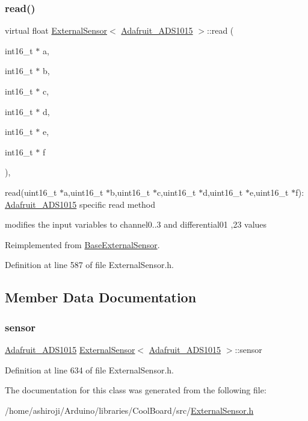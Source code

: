 \subsubsection{\texorpdfstring{read()}{read()}}
{\footnotesize\ttfamily virtual float \hyperlink{class_external_sensor}{External\+Sensor}$<$ \hyperlink{class_adafruit___a_d_s1015}{Adafruit\+\_\+\+A\+D\+S1015} $>$\+::read (\begin{DoxyParamCaption}\item[{int16\+\_\+t $\ast$}]{a,  }\item[{int16\+\_\+t $\ast$}]{b,  }\item[{int16\+\_\+t $\ast$}]{c,  }\item[{int16\+\_\+t $\ast$}]{d,  }\item[{int16\+\_\+t $\ast$}]{e,  }\item[{int16\+\_\+t $\ast$}]{f }\end{DoxyParamCaption})\hspace{0.3cm}{\ttfamily [inline]}, {\ttfamily [virtual]}}

read(uint16\+\_\+t $\ast$a,uint16\+\_\+t $\ast$b,uint16\+\_\+t $\ast$c,uint16\+\_\+t $\ast$d,uint16\+\_\+t $\ast$e,uint16\+\_\+t $\ast$f)\+: \hyperlink{class_adafruit___a_d_s1015}{Adafruit\+\_\+\+A\+D\+S1015} specific read method

modifies the input variables to channel0..3 and differential01 ,23 values 

Reimplemented from \hyperlink{class_base_external_sensor_a1867ba10561be26f2f5ec29421e6fb21}{Base\+External\+Sensor}.



Definition at line 587 of file External\+Sensor.\+h.



\subsection{Member Data Documentation}
\mbox{\label{class_external_sensor_3_01_adafruit___a_d_s1015_01_4_a9492450437bd0fe277dcb851177aa8fe}} 
\subsubsection{\texorpdfstring{sensor}{sensor}}
{\footnotesize\ttfamily \hyperlink{class_adafruit___a_d_s1015}{Adafruit\+\_\+\+A\+D\+S1015} \hyperlink{class_external_sensor}{External\+Sensor}$<$ \hyperlink{class_adafruit___a_d_s1015}{Adafruit\+\_\+\+A\+D\+S1015} $>$\+::sensor\hspace{0.3cm}{\ttfamily [private]}}



Definition at line 634 of file External\+Sensor.\+h.



The documentation for this class was generated from the following file\+:\begin{DoxyCompactItemize}
\item 
/home/ashiroji/\+Arduino/libraries/\+Cool\+Board/src/\hyperlink{_external_sensor_8h}{External\+Sensor.\+h}\end{DoxyCompactItemize}
